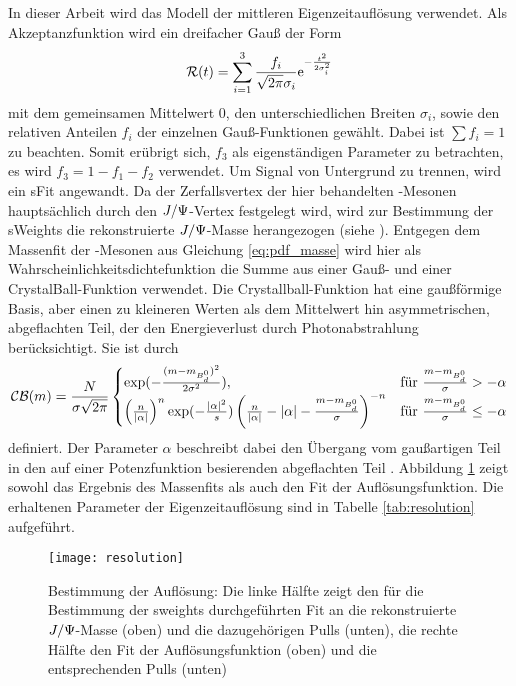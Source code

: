 In dieser Arbeit wird das Modell der mittleren Eigenzeitauflösung verwendet. Als Akzeptanzfunktion wird ein dreifacher Gauß der Form
\begin{align}
\mathcal{R}(t) = \sum_{i=1}^{3} \frac{f_i}{\sqrt{2\pi}\sigma_i}\mathrm{e}^{-\frac{t^2}{2\sigma_i^2}}
\end{align}
mit dem gemeinsamen Mittelwert $0$, den unterschiedlichen Breiten $\sigma_i$, sowie den relativen Anteilen $f_i$ der einzelnen Gauß-Funktionen gewählt. Dabei ist $\sum f_i = 1$ zu beachten. Somit erübrigt sich, $f_3$ als eigenständigen Parameter zu betrachten, es wird $f_3 = 1 - f_1 - f_2$ verwendet. Um Signal von Untergrund zu trennen, wird ein sFit angewandt. Da der Zerfallsvertex der hier behandelten \Bd-Mesonen hauptsächlich durch den $J/\Psi$-Vertex festgelegt wird, wird zur Bestimmung der sWeights die rekonstruierte $J/\Psi$-Masse herangezogen (siehe \cite{6}). Entgegen dem Massenfit der \Bd-Mesonen aus Gleichung \ref{eq:pdf_masse} wird hier als Wahrscheinlichkeitsdichtefunktion die Summe aus einer Gauß- und einer CrystalBall-Funktion verwendet. Die Crystallball-Funktion hat eine gaußförmige Basis, aber einen zu kleineren Werten als dem Mittelwert hin asymmetrischen, abgeflachten Teil, der den Energieverlust durch Photonabstrahlung berücksichtigt. Sie ist durch
\begin{align}
\mathcal{CB}(m) = \frac{N}{\sigma\sqrt{2\pi}} \begin{cases} \exp(-\frac{(m-m_{\text{$B_d^0$}})^2}{2\sigma^2}), & \text{für }\frac{m-m_{\text{$B_d^0$}}}{\sigma}>-\alpha \\ \left(\frac{n}{|\alpha|}\right)^n \exp(-\frac{|\alpha|^2}{s}) \left(\frac{n}{|\alpha|}-|\alpha|-\frac{m-m_{\text{$B_d^0$}}}{\sigma}\right)^{-n} & \text{für }\frac{m-m_{\text{$B_d^0$}}}{\sigma}\leq -\alpha \end{cases} 
\end{align}
definiert. Der Parameter $\alpha$ beschreibt dabei den Übergang vom gaußartigen Teil in den auf einer Potenzfunktion besierenden abgeflachten Teil \cite{crystal_ball}. Abbildung \ref{fig:resolution} zeigt sowohl das Ergebnis des Massenfits als auch den Fit der Auflösungsfunktion. Die erhaltenen Parameter der Eigenzeitauflösung sind in Tabelle \ref{tab:resolution} aufgeführt.

\begin{figure}[hptb]
\centering
\texttt{[image: resolution]}
\caption{Bestimmung der Auflösung: Die linke Hälfte zeigt den für die Bestimmung der sweights durchgeführten Fit an die rekonstruierte $J/\Psi$-Masse (oben) und die dazugehörigen Pulls (unten), die rechte Hälfte den Fit der Auflösungsfunktion (oben) und die entsprechenden Pulls (unten)}
\label{fig:resolution}
\end{figure}

